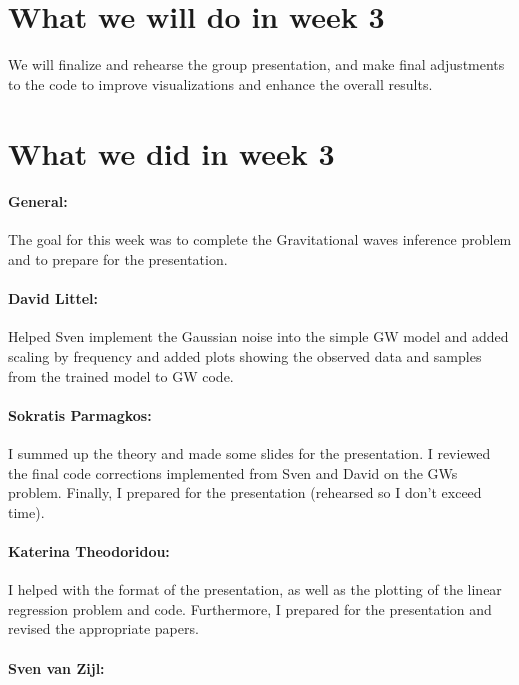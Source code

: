 \documentclass{article}
\begin{document}
\section*{What we will do in week 3}
We will finalize and rehearse the group presentation, and make final adjustments to the code to improve visualizations and enhance the overall results.


\section*{What we did in week 3}
\paragraph{General:}
The goal for this week was to complete the Gravitational waves inference problem and to prepare for the presentation.

\paragraph{David Littel:}
Helped Sven implement the Gaussian noise into the simple GW model and added scaling by frequency and added plots showing the observed data and samples from the trained model to GW code.

\paragraph{Sokratis Parmagkos:}
I summed up the theory and made some slides for the presentation. I reviewed the final code corrections implemented from Sven and David on the GWs problem. Finally, I prepared for the presentation (rehearsed so I don't exceed time).

\paragraph{Katerina Theodoridou:}
I helped with the format of the presentation, as well as the plotting of the linear regression problem and code. Furthermore, I prepared for the presentation and revised the appropriate papers. 

\paragraph{Sven van Zijl:}
\end{document}
